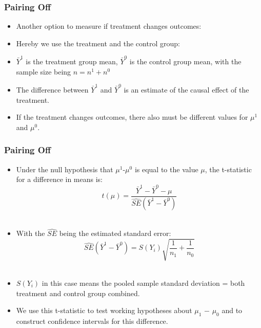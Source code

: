 \documentclass{beamer}
\begin{document}

\begin{frame}
\frametitle{Pairing Off}

\begin{itemize}
	\item Another option to measure if treatment changes outcomes:
	\item Hereby we use the treatment and the control group: 
	\item $\bar{Y}^1$ is the treatment group mean, $\bar{Y}^0$ is the control group mean, with the sample size being $n=n^1 + n^0$
	\item The difference between $\bar{Y}^1$ and $\bar{Y}^0$ is an estimate of the causal effect of the treatment.
	\item If the treatment changes outcomes, there also must be different values for $\mu^1$ and $\mu^0$. 
\end{itemize}

\end{frame}


\begin{frame}
\frametitle{Pairing Off}

\begin{itemize}
	\item Under the null hypothesis that $\mu^1 $-$ \mu^0$ is equal to the value $\mu$, the t-statistic for a difference in means is: \\
		\begin{equation*}
			t(\mu)=\frac{\bar{Y}^1-\bar{Y}^0-\mu}{{\hat{SE}(\bar{Y}^1-\bar{Y}^0)}}
		\end{equation*} \\
	\item With the $\hat{SE}$ being the estimated standard error: \\
		\begin{equation*}
			\hat{SE}(\bar{Y}^1-\bar{Y}^0) = S(Y_i)\sqrt{\frac{1}{n_1}+\frac{1}{n_0}}
		\end{equation*} \\
	\item $S(Y_i)$ in this case means the pooled sample standard deviation = both treatment and control group combined.
	\item We use this t-statistic to test working hypotheses about $\mu_1$ $-$ $\mu_0$ and to
construct confidence intervals for this difference.
\end{itemize}

\end{frame}
\end{document}
